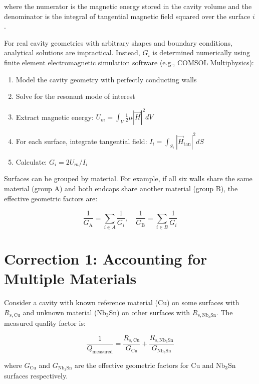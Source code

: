 \noindnet where the numerator is the magnetic energy stored in the cavity volume and the denominator is the integral of tangential magnetic field squared over the surface $i$. 

For real cavity geometries with arbitrary shapes and boundary conditions, analytical solutions are impractical. Instead, $G_i$ is determined numerically using finite element electromagnetic simulation software (e.g., COMSOL Multiphysics):

\begin{enumerate}
    \item Model the cavity geometry with perfectly conducting walls
    \item Solve for the resonant mode of interest
    \item Extract magnetic energy: $U_m = \int_V \frac{1}{2}\mu|\vec{H}|^2 dV$
    \item For each surface, integrate tangential field: $I_i = \int_{S_i} |\vec{H}_\text{tan}|^2 dS$
    \item Calculate: $G_i = 2U_m / I_i$
\end{enumerate}

Surfaces can be grouped by material. For example, if all six walls share the same material (group A) and both endcaps share another material (group B), the effective geometric factors are:

\begin{equation}
\frac{1}{G_\text{A}} = \sum_{i \in A} \frac{1}{G_i}, \quad \frac{1}{G_\text{B}} = \sum_{i \in B} \frac{1}{G_i}
\label{eq:G_grouped}
\end{equation}

\section{Correction 1: Accounting for Multiple Materials}

Consider a cavity with known reference material (Cu) on some surfaces with $R_{s,\text{Cu}}$ and unknown material (Nb$_3$Sn) on other surfaces with $R_{s,\text{Nb}_3\text{Sn}}$. The measured quality factor is:

\begin{equation}
    \frac{1}{Q_\text{measured}} = \frac{R_{s,\text{Cu}}}{G_\text{Cu}} + \frac{R_{s,\text{Nb}_3\text{Sn}}}{G_{\text{Nb}_3\text{Sn}}}
    \label{eq:Q_hybrid}
\end{equation}

where $G_\text{Cu}$ and $G_{\text{Nb}_3\text{Sn}}$ are the effective geometric factors for Cu and Nb$_3$Sn surfaces respectively.

